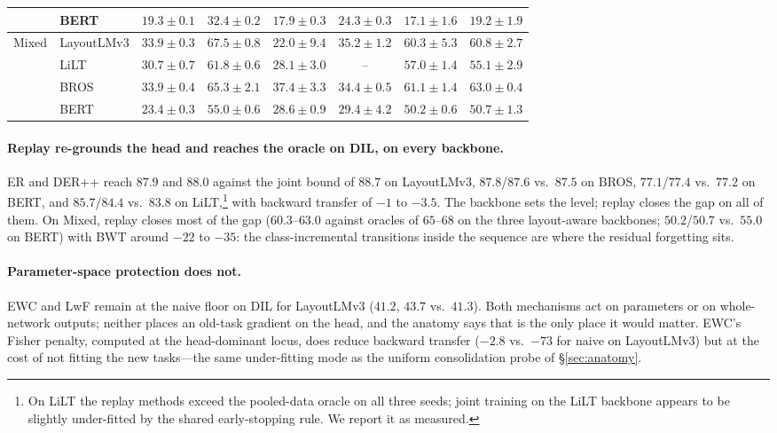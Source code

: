\documentclass{article}
\begin{document}
\begin{table}[t]
{\begin{tabular}{llcccccc}
 & BERT       & $19.3{\pm}0.1$ & $32.4{\pm}0.2$ & $17.9{\pm}0.3$ & $24.3{\pm}0.3$ & $17.1{\pm}1.6$ & $19.2{\pm}1.9$ \\
\midrule
\multirow{4}{*}{Mixed}
 & LayoutLMv3 & $33.9{\pm}0.3$ & $67.5{\pm}0.8$ & $22.0{\pm}9.4$ & $35.2{\pm}1.2$ & $60.3{\pm}5.3$ & $60.8{\pm}2.7$ \\
 & LiLT       & $30.7{\pm}0.7$ & $61.8{\pm}0.6$ & $28.1{\pm}3.0$ & \cellcolor{gray!25}-- & $57.0{\pm}1.4$ & $55.1{\pm}2.9$ \\
 & BROS       & $33.9{\pm}0.4$ & $65.3{\pm}2.1$ & $37.4{\pm}3.3$ & $34.4{\pm}0.5$ & $61.1{\pm}1.4$ & $63.0{\pm}0.4$ \\
 & BERT       & $23.4{\pm}0.3$ & $55.0{\pm}0.6$ & $28.6{\pm}0.9$ & $29.4{\pm}4.2$ & $50.2{\pm}0.6$ & $50.7{\pm}1.3$ \\
\bottomrule
\end{tabular}}
\end{table}

\paragraph{Replay re-grounds the head and reaches the oracle on DIL, on every backbone.} ER and DER++ reach $87.9$ and $88.0$ against the joint bound of $88.7$ on LayoutLMv3, $87.8$/$87.6$ vs.\ $87.5$ on BROS, $77.1$/$77.4$ vs.\ $77.2$ on BERT, and $85.7$/$84.4$ vs.\ $83.8$ on LiLT,\footnote{On LiLT the replay methods exceed the pooled-data oracle on all three seeds; joint training on the LiLT backbone appears to be slightly under-fitted by the shared early-stopping rule. We report it as measured.} with backward transfer of $-1$ to $-3.5$. The backbone sets the level; replay closes the gap on all of them. On Mixed, replay closes most of the gap ($60.3$--$63.0$ against oracles of $65$--$68$ on the three layout-aware backbones; $50.2$/$50.7$ vs.\ $55.0$ on BERT) with BWT around $-22$ to $-35$: the class-incremental transitions inside the sequence are where the residual forgetting sits.

\paragraph{Parameter-space protection does not.} EWC and LwF remain at the naive floor on DIL for LayoutLMv3 ($41.2$, $43.7$ vs.\ $41.3$). Both mechanisms act on parameters or on whole-network outputs; neither places an old-task gradient on the head, and the anatomy says that is the only place it would matter. EWC's Fisher penalty, computed at the head-dominant locus, does reduce backward transfer ($-2.8$ vs.\ $-73$ for naive on LayoutLMv3) but at the cost of not fitting the new tasks---the same under-fitting mode as the uniform consolidation probe of \S\ref{sec:anatomy}.
\end{document}
